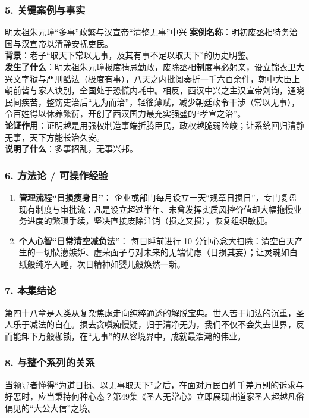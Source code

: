 \subsubsection{5. 关键案例与事实}
\begin{CaseBox}{明太祖朱元璋“多事”政繁与汉宣帝“清整无事”中兴}
\textbf{案例名称}：明初废丞相特务治国与汉宣帝以清静安抚吏民。\\
\textbf{背景}：老子“取天下常以无事，及其有事不足以取天下”的历史明鉴。\\
\textbf{发生了什么}：明太祖朱元璋极度猜忌勤政，废除丞相制度事必躬亲，设立锦衣卫大兴文字狱与严刑酷法（极度有事），八天之内批阅奏折一千六百余件，朝中大臣上朝前皆与家人诀别，全国处于恐慌内耗中。相反，西汉中兴之主汉宣帝刘询，通晓民间疾苦，整饬吏治后“无为而治”，轻徭薄赋，减少朝廷政令干涉（常以无事），令百姓得以休养繁衍，开创了西汉国力最充实强盛的“孝宣之治”。\\
\textbf{论证作用}：证明越是用强权制造事端折腾臣民，政权越脆弱险峻；让系统回归清静无事，天下方能长治久安。\\
\textbf{说明了什么}：多事招乱，无事兴邦。
\end{CaseBox}

\subsubsection{6. 方法论 / 可操作经验}
\begin{enumerate}
    \item \textbf{管理流程“日损瘦身日”}：
    企业或部门每月设立一天“规章日损日”，专门复盘现有制度与审批流：凡是设立超过半年、未曾发挥实质风控价值却大幅拖慢业务进度的繁琐手续，坚决直接废除注销（损之又损），恢复组织敏捷。
    \item \textbf{个人心智“日常清空减负法”}：
    每日睡前进行 10 分钟心念大扫除：清空白天产生的一切愤懑嫉妒、虚荣面子与对未来的无端忧虑（日损其妄）；让灵魂如白纸般纯净入睡，次日精神如婴儿般焕然一新。
\end{enumerate}

\subsubsection{7. 本集结论}
第四十八章是人类从复杂焦虑走向纯粹通透的解脱宝典。世人苦于加法的沉重，圣人乐于减法的自在。损去贪嗔痴慢疑，归于清净无为，我们不仅不会失去世界，反而能卸下万般枷锁，在“无事”的从容境界中，成就最浩瀚的伟业。

\subsubsection{8. 与整个系列的关系}
当领导者懂得“为道日损、以无事取天下”之后，在面对万民百姓千差万别的诉求与好恶时，应当秉持何种心态？第49集《圣人无常心》立即展现出道家圣人超越凡俗偏见的“大公大信”之境。

